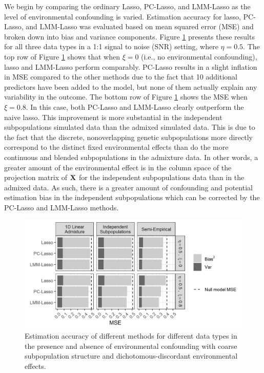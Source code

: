 We begin by comparing the ordinary Lasso, PC-Lasso, and LMM-Lasso as the level of environmental confounding is varied. Estimation accuracy for lasso, PC-Lasso, and LMM-Lasso was evaluated based on mean squared error (MSE) and broken down into bias and variance components. Figure \ref{fig:mse} presents these results for all three data types in a 1:1 signal to noise (SNR) setting, where $\eta = 0.5$. The top row of Figure \ref{fig:mse} shows that when $\xi = 0$ (i.e., no environmental confounding), lasso and LMM-Lasso perform comparably. PC-Lasso results in a slight inflation in MSE compared to the other methods due to the fact that 10 additional predictors have been added to the model, but none of them actually explain any variability in the outcome. The bottom row of Figure \ref{fig:mse} shows the MSE when $\xi = 0.8$. In this case, both PC-Lasso and LMM-Lasso clearly outperform the naive lasso. This improvement is more substantial in the independent subpopulations simulated data than the admixed simulated data.  This is due to the fact that the discrete, nonoverlapping genetic subpopulations more directly correspond to the distinct fixed environmental effects than do the more continuous and blended subpopulations in the admixture data. In other words, a greater amount of the environmental effect is in the column space of the projection matrix of $\textbf{X}$ for the independent subpopulations data than in the admixed data. As such, there is a greater amount of confounding and potential estimation bias in the independent subpopulations which can be corrected by the PC-Lasso and LMM-Lasso methods. 

\begin{figure}[H]
    \centering
    \includegraphics[scale = 1.1]{figures/beta_mse.png}
    \caption{Estimation accuracy of different methods for different data types in the presence and absence of environmental confounding with coarse subpopulation structure and dichotomous-discordant environmental effects.}
    \label{fig:mse}
\end{figure}

